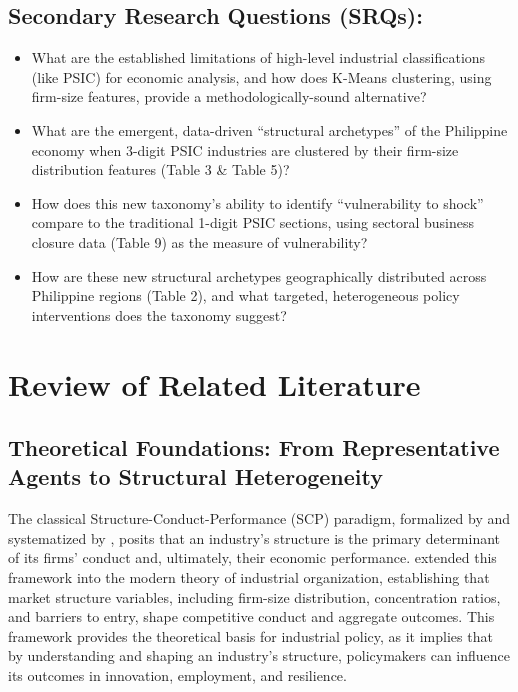 \documentclass[acmtog, nonacm]{acmart}
\begin{document}
\subsection{Secondary Research Questions (SRQs):}
\begin{itemize}
    \item What are the established limitations of high-level industrial classifications (like PSIC) for economic analysis, and how does K-Means clustering, using firm-size features, provide a methodologically-sound alternative?
    \item What are the emergent, data-driven ``structural archetypes'' of the Philippine economy when 3-digit PSIC industries are clustered by their firm-size distribution features (Table 3 \& Table 5)?
    \item How does this new taxonomy's ability to identify ``vulnerability to shock'' compare to the traditional 1-digit PSIC sections, using sectoral business closure data (Table 9) as the measure of vulnerability?
    \item How are these new structural archetypes geographically distributed across Philippine regions (Table 2), and what targeted, heterogeneous policy interventions does the taxonomy suggest?
\end{itemize}


\section{Review of Related Literature}

\subsection{Theoretical Foundations: From Representative Agents to Structural Heterogeneity}
The classical Structure-Conduct-Performance (SCP) paradigm, formalized by \citet{mason1939} and systematized by \citet{bain1956}, posits that an industry's structure is the primary determinant of its firms' conduct and, ultimately, their economic performance. \citet{scherer1990} extended this framework into the modern theory of industrial organization, establishing that market structure variables, including firm-size distribution, concentration ratios, and barriers to entry, shape competitive conduct and aggregate outcomes. This framework provides the theoretical basis for industrial policy, as it implies that by understanding and shaping an industry's structure, policymakers can influence its outcomes in innovation, employment, and resilience.
\end{document}
